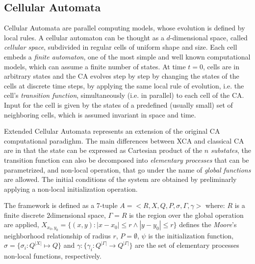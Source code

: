 \subsection{Cellular Automata}\label{sec:CA}
    Cellular Automata are parallel computing models, whose evolution
    is defined by local rules. A cellular automaton can be thought as
    a $d$-dimensional space, called \emph{cellular space}, subdivided
    in regular cells of uniform shape and size. Each cell embeds a
    \emph{finite automaton}, one of the most simple and well known
    computational models, which can assume a finite number of
    states. At time $t=0$, cells are in arbitrary states and the CA
    evolves step by step by changing the states of the cells at
    discrete time steps, by applying the same local rule of evolution,
    i.e. the cell's \emph{transition function}, simultaneously
    (i.e. in parallel) to each cell of the CA. Input for the cell is
    given by the states of a predefined (usually small) set of
    neighboring cells, which is assumed invariant in space and time.
 
 Extended Cellular Automata\cite{DiGregorio&Serra-1999}  represents an extension of the original CA computational paradighm.   
    The main differences between XCA and classical CA are in that the state can be expressed as Cartesian product of the $n$ 
    \emph{substates}, the transition function can also be decomposed into \textit{elementary processes} that can be parametrized,
    and non-local operation, that go under the name of \textit{global functions} are allowed.
        The initial conditions of the system are obtained by preliminarly
    applying a non-local initialization operation.
    

    The framework is defined as a 7-tuple $ A = <R,X,Q,P,\sigma,\Gamma,\gamma>$ where:    
    $R$ is a finite discrete $2$dimensional space, $\Gamma=R$ is the region over the global operation are applied,
    $X_{x_0,y_0}=\{(x,y): \left| x-x_0\right| \leq r \wedge \left| y-y_0\right| \leq r\} $ defines the \textit{Moore}'s neighborhood relationship of radius $r$, $P=\emptyset$, $\psi$ is the initialization function, $\sigma=\{\sigma_i:Q^{|X|} \mapsto Q\}$ and   $\gamma: \{\gamma_i:Q^{|\Gamma|} \rightarrow Q^{|\Gamma|}\} $ are the set of  elementary processes non-local functions, respectively.
    

